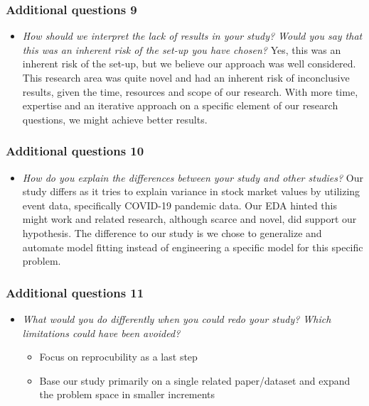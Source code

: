 \documentclass[aspectratio=169,classic]{uva-inf-presentation}
\begin{document}
\begin{frame}
\frametitle{Additional questions 9}
\begin{itemize}
    \item \textit{How should we interpret the lack of results in your study? Would you say that this was an inherent risk of the set-up you have chosen?} \newline
    Yes, this was an inherent risk of the set-up, but we believe our approach was well considered. This research area was quite novel and had an inherent risk of inconclusive results, given the time, resources and scope of our research. With more time, expertise and an iterative approach on a specific element of our research questions, we might achieve better results.
\end{itemize}
\end{frame} 

 

\begin{frame}
\frametitle{Additional questions 10}
\begin{itemize}
    \item \textit{How do you explain the differences between your study and other studies?} \newline
    Our study differs as it tries to explain variance in stock market values by utilizing event data, specifically COVID-19 pandemic data. Our EDA hinted this might work and related research, although scarce and novel, did support our hypothesis. The difference to our study is we chose to generalize and automate model fitting instead of engineering a specific model for this specific problem.
\end{itemize}
\end{frame} 

\begin{frame}
\frametitle{Additional questions 11}
\begin{itemize}
    \item \textit{What would you do differently when you could redo your study? Which limitations could have been avoided?} \newline
    \begin{itemize}
        \item Focus on reprocubility as a last step
        \item Base our study primarily on a single related paper/dataset and expand the problem space in smaller increments
    \end{itemize}
\end{itemize}
\end{frame} 
\end{document}

